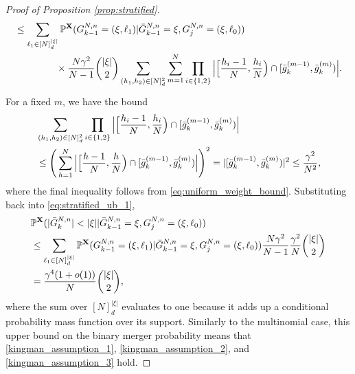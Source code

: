 \documentclass[10pt,a4paper]{amsart}
\newcommand{\bbP}{\mathbb{P}}
\newcommand{\bfX}{\mathbf{X}}
\begin{document}
\begin{proof}[Proof of Proposition \ref{prop:stratified}]
\begin{align}
&\leq \sum_{ \ell_1 \in [ N ]_d^{ | \xi | } } \bbP^{ \bfX }( G_{ k - 1 }^{ N, n } = ( \xi, \ell_1 ) | \bar{ G }_{ k - 1 }^{ N, n } = \xi, G_j^{ N, n } = ( \xi, \ell_0 ) ) \notag \\
&\phantom{ \leq \sum_{ \ell_1 \in [ N ]_d^{ | \xi | } } } \times \frac{ N \gamma^2 }{ N - 1 } \binom{ | \xi | }{ 2 } \sum_{ ( h_1, h_2 ) \in [ N ]_d^2 } \sum_{ m = 1 }^N \prod_{ i \in \{ 1, 2 \} } \Big| \Big[ \frac{ h_i - 1 }{ N }, \frac{ h_i }{ N } \Big) \cap [ \bar{ g }_k^{ ( m - 1 ) }, \bar{ g }_k^{ ( m ) } ) \Big|. \label{eq:stratified_ub_1}
\end{align}
For a fixed $m$, we have the bound
\begin{align}
&\sum_{ ( h_1, h_2 ) \in [ N ]_d^2 } \prod_{ i \in \{ 1, 2 \} } \Big| \Big[ \frac{ h_i - 1 }{ N }, \frac{ h_i }{ N } \Big) \cap [ \bar{ g }_k^{ ( m - 1 ) }, \bar{ g }_k^{ ( m ) } ) \Big| \notag \\
&\leq \Bigg( \sum_{ h = 1 }^N \Big| \Big[ \frac{ h - 1 }{ N }, \frac{ h }{ N } \Big) \cap [ \bar{ g }_k^{ ( m - 1 ) }, \bar{ g }_k^{ ( m ) } ) \Big| \Bigg)^2 = | [ \bar{ g }_k^{ ( m - 1 ) }, \bar{ g }_k^{ ( m ) } ) |^2 \leq \frac{ \gamma^2 }{ N^2 }, \label{eq:stratified_numerator}
\end{align}
where the final inequality follows from \eqref{eq:uniform_weight_bound}.
Substituting back into \eqref{eq:stratified_ub_1},
\begin{align}
&\bbP^{ \bfX }( | \bar{ G }_k^{ N, n } | < | \xi | | \bar{ G }_{ k - 1 }^{ N, n } = \xi, G_j^{ N, n } = ( \xi, \ell_0 ) ) \notag \\
&\leq \sum_{ \ell_1 \in [ N ]_d^{ | \xi | } } \bbP^{ \bfX }( G_{ k - 1 }^{ N, n } = ( \xi, \ell_1 ) | \bar{ G }_{ k - 1 }^{ N, n } = \xi, G_j^{ N, n } = ( \xi, \ell_0 ) ) \frac{ N \gamma^2 }{ N - 1 } \frac{ \gamma^2 }{ N } \binom{ | \xi | }{ 2 } \notag \\
&= \frac{ \gamma^4 ( 1 + o( 1 ) ) }{ N } \binom{ | \xi | }{ 2 }, \label{eq:stratified_merger_ub}
\end{align}
where the sum over $[ N ]_d^{ | \xi | }$ evaluates to one because it adds up a conditional probability mass function over its support.
Similarly to the multinomial case, this upper bound on the binary merger probability means that \eqref{kingman_assumption_1}, \eqref{kingman_assumption_2}, and \eqref{kingman_assumption_3} hold.


\end{proof}
\end{document}
